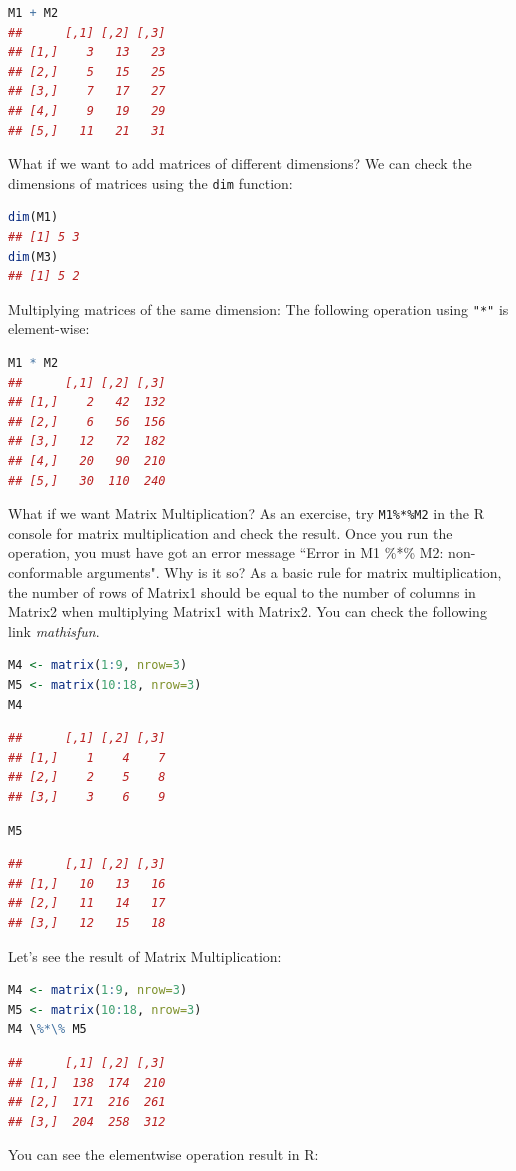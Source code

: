 \documentclass[10pt]{book}
\begin{document}
\begin{lstlisting}[language=R]
M1 + M2
##      [,1] [,2] [,3]
## [1,]    3   13   23
## [2,]    5   15   25
## [3,]    7   17   27
## [4,]    9   19   29
## [5,]   11   21   31
\end{lstlisting}

What if we want to add matrices of different dimensions? We can check the dimensions of matrices using the \texttt{dim} function:

\begin{lstlisting}[language=R]
dim(M1)
## [1] 5 3
dim(M3)
## [1] 5 2
\end{lstlisting}

Multiplying matrices of the same dimension: The following operation using \texttt{"*"} is element-wise:

\begin{lstlisting}[language=R]
M1 * M2
##      [,1] [,2] [,3]
## [1,]    2   42  132
## [2,]    6   56  156
## [3,]   12   72  182
## [4,]   20   90  210
## [5,]   30  110  240
\end{lstlisting}
What if we want Matrix Multiplication? As an exercise, try \texttt{M1\%*\%M2} in the R console for matrix multiplication and check the result. Once you run the operation, you must have got an error message ``Error in M1 \%*\% M2: non-conformable arguments". Why is it so? As a basic rule for matrix multiplication, the number of rows of Matrix1 should be equal to the number of columns in Matrix2 when multiplying Matrix1 with Matrix2. You can check the following link \textit{mathisfun}.

\begin{lstlisting}[language=R]
M4 <- matrix(1:9, nrow=3)
M5 <- matrix(10:18, nrow=3)
M4
\end{lstlisting}
\begin{lstlisting}[language=R]
##      [,1] [,2] [,3]
## [1,]    1    4    7
## [2,]    2    5    8
## [3,]    3    6    9
\end{lstlisting}
\begin{lstlisting}[language=R]
M5
\end{lstlisting}
\begin{lstlisting}[language=R]
##      [,1] [,2] [,3]
## [1,]   10   13   16
## [2,]   11   14   17
## [3,]   12   15   18
\end{lstlisting}
Let's see the result of Matrix Multiplication:

\begin{lstlisting}[language=R]
M4 <- matrix(1:9, nrow=3)
M5 <- matrix(10:18, nrow=3)
M4 \%*\% M5
\end{lstlisting}
\begin{lstlisting}[language=R]
##      [,1] [,2] [,3]
## [1,]  138  174  210
## [2,]  171  216  261
## [3,]  204  258  312
\end{lstlisting}
You can see the elementwise operation result in R:
\end{document}
